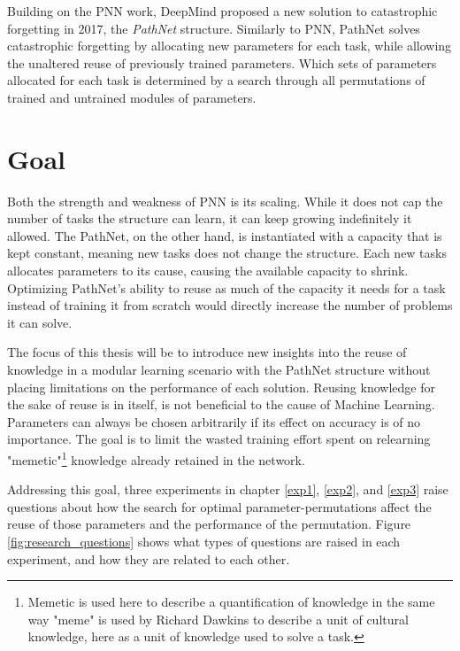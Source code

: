 Building on the PNN work, DeepMind proposed a new solution to catastrophic forgetting in 2017, the \emph{PathNet} structure\cite{pathnet}. Similarly to PNN, PathNet solves catastrophic forgetting by allocating new parameters for each task, while allowing the unaltered reuse of previously trained parameters. Which sets of parameters allocated for each task is determined by a search through all permutations of trained and untrained modules of parameters.

\section{Goal}
Both the strength and weakness of PNN is its scaling. While it does not cap the number of tasks the structure can learn, it can keep growing indefinitely it allowed. The PathNet, on the other hand, is instantiated with a capacity that is kept constant, meaning new tasks does not change the structure. Each new tasks allocates parameters to its cause, causing the available capacity to shrink. Optimizing PathNet's ability to reuse as much of the capacity it needs for a task instead of training it from scratch would directly increase the number of problems it can solve. 

The focus of this thesis will be to introduce new insights into the reuse of knowledge in a modular learning scenario with the PathNet structure\cite{pathnet} without placing limitations on the performance of each solution. Reusing knowledge for the sake of reuse is in itself, is not beneficial to the cause of Machine Learning. Parameters can always be chosen arbitrarily if its effect on accuracy is of no importance. The goal is to limit the wasted training effort spent on relearning "memetic"\footnote{Memetic is used here to describe a quantification of knowledge in the same way "meme" is used by Richard Dawkins\cite{selfishGene} to describe a unit of cultural knowledge, here as a unit of knowledge used to solve a task.} knowledge already retained in the network. 

Addressing this goal, three experiments in chapter \ref{exp1}, \ref{exp2}, and \ref{exp3} raise questions about how the search for optimal parameter-permutations affect the reuse of those parameters and the performance of the permutation. Figure \ref{fig:research_questions} shows what types of questions are raised in each experiment, and how they are related to each other. 

